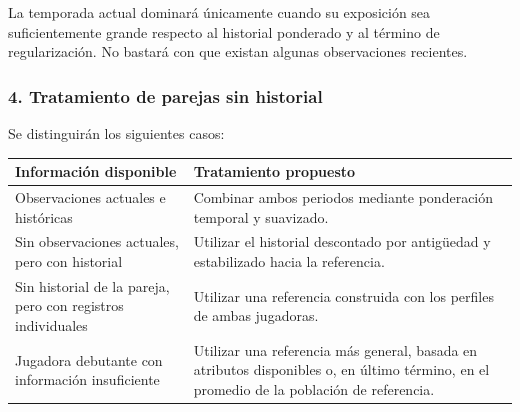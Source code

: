 La temporada actual dominará únicamente cuando su exposición sea suficientemente grande respecto al historial ponderado y al término de regularización. No bastará con que existan algunas observaciones recientes.

\subsubsection*{4. Tratamiento de parejas sin historial}
Se distinguirán los siguientes casos:
\begin{longtable}{@{}p{6cm}p{7cm}@{}}
\toprule \textbf{Información disponible}&\textbf{Tratamiento propuesto}\\\midrule\endhead
Observaciones actuales e históricas&Combinar ambos periodos mediante ponderación temporal y suavizado.\\
Sin observaciones actuales, pero con historial&Utilizar el historial descontado por antigüedad y estabilizado hacia la referencia.\\
Sin historial de la pareja, pero con registros individuales&Utilizar una referencia construida con los perfiles de ambas jugadoras.\\
Jugadora debutante con información insuficiente&Utilizar una referencia más general, basada en atributos disponibles o, en último término, en el promedio de la población de referencia.\\
\bottomrule
\end{longtable}
